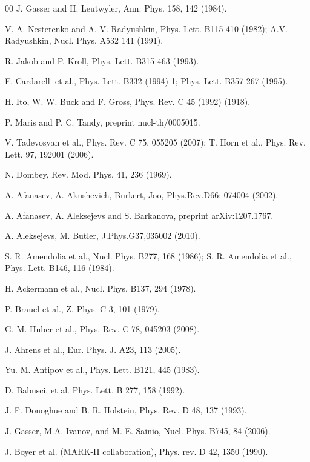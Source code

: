 \documentclass[3p,times,twocolumn]{revtex4}
\begin{document}
\begin{thebibliography}{00}
J. Gasser and H. Leutwyler, Ann. Phys. 158, 142 (1984).

V. A. Nesterenko and A. V. Radyushkin, Phys. Lett. B115
410 (1982); A.V. Radyushkin, Nucl. Phys. A532 141 (1991).

R. Jakob and P. Kroll, Phys. Lett. B315 463 (1993).

F. Cardarelli et al., Phys. Lett. B332 (1994) 1; Phys.
Lett. B357 267 (1995).

H. Ito, W. W. Buck and F. Gross, Phys. Rev. C 45 (1992)
(1918).

P. Maris and P. C. Tandy, preprint nucl-th/0005015.

V. Tadevosyan et al., Phys. Rev. C 75, 055205 (2007);
T. Horn et al., Phys. Rev. Lett. 97, 192001 (2006). 

N. Dombey, Rev. Mod. Phys. 41, 236 (1969). 

A. Afanasev, A. Akushevich, Burkert, Joo, Phys.Rev.D66:
074004 (2002).

A. Afanasev, A. Aleksejevs and S. Barkanova, preprint
arXiv:1207.1767.

A. Aleksejevs, M. Butler, J.Phys.G37,035002 (2010).

S. R. Amendolia et al., Nucl. Phys. B277, 168 (1986);
S. R. Amendolia et al., Phys. Lett. B146, 116 (1984).

H. Ackermann et al., Nucl. Phys. B137, 294 (1978). 

P. Brauel et al., Z. Phys. C 3, 101 (1979). 

G. M. Huber et al., Phys. Rev. C 78, 045203 (2008).

J. Ahrens et al., Eur. Phys. J. A23, 113 (2005).

Yu. M. Antipov et al., Phys. Lett. B121, 445 (1983).

D. Babusci, et al. Phys. Lett. B 277, 158 (1992).

J. F. Donoghue and B. R. Holstein, Phys. Rev. D 48,
137 (1993).

J. Gasser, M.A. Ivanov, and M. E. Sainio, Nucl. Phys.
B745, 84 (2006).

J. Boyer et al. (MARK-II collaboration), Phys. rev.
D 42, 1350 (1990).


\end{thebibliography}
\end{document}
